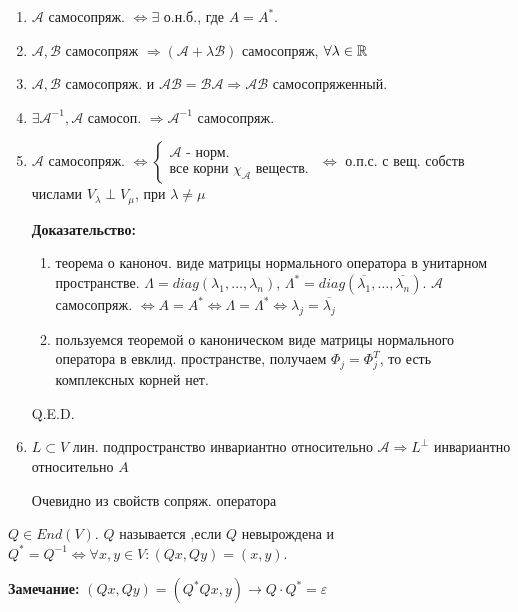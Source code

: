\begin{enumerate}
    \item $\mathcal{A}$ самосопряж. $\Leftrightarrow \exists $ о.н.б., где $A = A^*$. 
    \item $\mathcal{A}, \mathcal{B}$ самосопряж $\Rightarrow (\mathcal{A}+\lambda \mathcal{B})$ самосопряж, $\forall \lambda \in \mathbb{R}$
    \item $\mathcal{A},\mathcal{B}$ самосопряж. и $\mathcal{A}\mathcal{B}=\mathcal{BA}\Rightarrow \mathcal{AB}$ самосопряженный.
    \item $\exists \mathcal{A}^{-1},\mathcal{A}$ самосоп. $\Rightarrow \mathcal{A}^{-1}$ самосопряж.
    \item $\mathcal{A}$ самосопряж. $\Leftrightarrow \begin{cases}
        \mathcal{A} \text{ - норм.}\\
        \text{все корни $\chi_{\mathcal{A}}$ веществ.   }
    \end{cases} \Leftrightarrow$ о.п.с. с вещ. собств числами $V_\lambda \perp V_\mu$, при $\lambda\neq \mu$

    \textbf{Доказательство:}

    \begin{enumerate}
        \item теорема о каноноч. виде матрицы нормального оператора в унитарном пространстве. $\Lambda = diag (\lambda_1,\ldots, \lambda_n)$, $\Lambda^* = diag(\overline{\lambda_1},\ldots,\overline{\lambda_n})$. $\mathcal{A}$ самосопряж. $\Leftrightarrow A = A^* \Leftrightarrow \Lambda = \Lambda^* \Leftrightarrow \lambda_j = \overline{\lambda_j}$
        \item пользуемся теоремой о каноническом виде матрицы нормального оператора в евклид. пространстве, получаем $\Phi_j = \Phi_j^T$, то есть комплексных корней нет.
    \end{enumerate}

    \hfill Q.E.D.


    \item $L \subset V$ лин. подпространство инвариантно относительно $\mathcal{A} \Rightarrow L^\perp$ инвариантно относительно $A$

    Очевидно из свойств сопряж. оператора
\end{enumerate}


 $Q\in End(V)$. $Q$ называется ,если $Q$ невырождена  и $Q^*=Q^{-1} \Leftrightarrow \forall x,y \in V: (Qx,Qy)= (x,y)$. 

\textbf{Замечание:}  $(Qx,Qy) = (Q^*Qx,y) \rightarrow{ Q \cdot Q^* = \varepsilon}$

